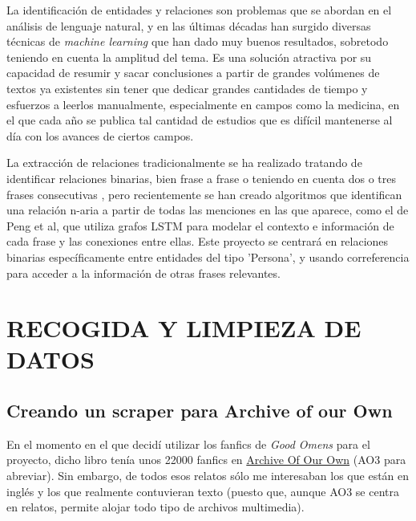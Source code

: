 \documentclass{pre-tfg}
\begin{document}
La identificación de entidades y relaciones son problemas que se abordan en el análisis de lenguaje natural, y en las últimas décadas han surgido diversas técnicas de \textit{machine learning} que han dado muy buenos resultados, sobretodo teniendo en cuenta la amplitud del tema. Es una solución atractiva por su capacidad de resumir y sacar conclusiones a partir de grandes volúmenes de textos ya existentes sin tener que dedicar grandes cantidades de tiempo y esfuerzos a leerlos manualmente, especialmente en campos como la medicina, en el que cada año se publica tal cantidad de estudios que es difícil mantenerse al día con los avances de ciertos campos.

La extracción de relaciones tradicionalmente se ha realizado tratando de identificar relaciones binarias, bien frase a frase o teniendo en cuenta dos o tres frases consecutivas\cite{zelenko_2003} \cite{craven_99}, pero recientemente se han creado algoritmos que identifican una relación n-aria a partir de todas las menciones en las que aparece, como el de Peng et al\cite{peng_17}, que utiliza grafos LSTM para modelar el contexto e información de cada frase y las conexiones entre ellas. Este proyecto se centrará en relaciones binarias específicamente entre entidades del tipo 'Persona', y usando correferencia para acceder a la información de otras frases relevantes.






\section{RECOGIDA Y LIMPIEZA DE DATOS}

\subsection{Creando un scraper para Archive of our Own}
\label{sec:recogidadatos}

En el momento en el que decidí utilizar los fanfics de \textit{Good Omens} para el proyecto, dicho libro tenía unos 22000 fanfics en \href{archiveofourown.org}{Archive Of Our Own} (AO3 para abreviar). Sin embargo, de todos esos relatos sólo me interesaban los que están en inglés y los que realmente contuvieran texto (puesto que, aunque AO3 se centra en relatos, permite alojar todo tipo de archivos multimedia).
\end{document}
